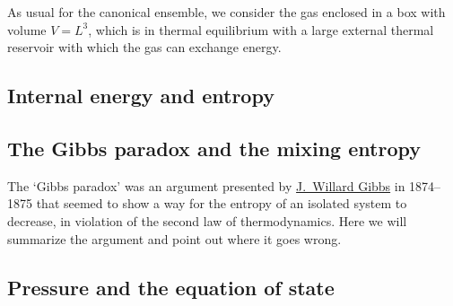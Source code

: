 As usual for the canonical ensemble, we consider the gas enclosed in a box with volume $V = L^3$, which is in thermal equilibrium with a large external thermal reservoir with which the gas can exchange energy.






\newpage %
\subsection{Internal energy and entropy}



\newpage %
\subsection{The Gibbs paradox and the mixing entropy}
The `Gibbs paradox' was an argument presented by \href{https://en.wikipedia.org/wiki/Josiah_Willard_Gibbs}{J.\ Willard Gibbs} in 1874--1875 that seemed to show a way for the entropy of an isolated system to decrease, in violation of the second law of thermodynamics.
Here we will summarize the argument and point out where it goes wrong.




\newpage %
\subsection{Pressure and the equation of state}
